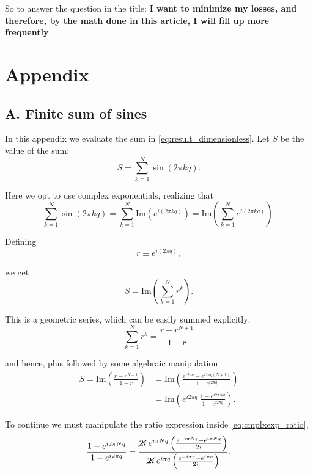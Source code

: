 \documentclass[11pt]{article}
\begin{document}
\par 
So to answer the question in the title: \textbf{I want to minimize my losses, and therefore, by the math done in this article, I will fill up more frequently}.


\section*{Appendix}

\subsection*{A. Finite sum of sines}
\label{subsec:sine_sum}

\renewcommand{\theequation}{A.\arabic{equation}}
\renewcommand{\Im}[1]{\text{Im}\left({#1}\right)}
\renewcommand{\exp}[1]{e^{#1}}
In this appendix we evaluate the sum in \eqref{eq:result_dimensionless}. Let $S$ be the value of the sum:
\begin{equation}
S = \sum_{k=1}^{N} \sin (2 \pi k q).
\end{equation}

Here we opt to use complex exponentials, realizing that
\begin{equation}
\sum_{k=1}^{N} \sin (2 \pi k q) = \sum_{k=1}^{N} \Im{\exp{i(2 \pi k q)}} = \Im{\sum_{k=1}^{N} \exp{i(2 \pi k q)}}.
\end{equation}

Defining
$$
r \equiv e^{i(2 \pi q)},
$$

we get
\begin{equation}
S = \Im{\sum_{k=1}^{N} r^{k}}.
\end{equation}

This is a geometric series, which can be easily summed explicitly:
\begin{equation}
\sum_{k=1}^{N} r^{k} = \frac{r - r^{N+1}}{1 - r}
\end{equation}

and hence, plus followed by some algebraic manipulation
\begin{align}
S = \Im{\frac{r - r^{N+1}}{1 - r}} &= \Im{\frac{\exp{i 2\pi q} - \exp{i 2\pi q (N+1)}}{1 - \exp{i 2\pi q}}} \nonumber \\[0.4em]
 &= \Im{\exp{i 2\pi q} \: \frac{1 - \exp{i 2\pi Nq}}{1 - \exp{i 2\pi q}}}. \label{eq:cmplxexp_ratio}
\end{align}

To continue we must manipulate the ratio expression inside \eqref{eq:cmplxexp_ratio},
$$
\frac{1 - \exp{i 2\pi Nq}}{1 - \exp{i 2 \pi q}} = 
\frac{\cancel{2i} \: \exp{i \pi Nq}\left(\frac{\exp{-i\pi Nq} - \exp{i\pi Nq}}{2i}\right)}{\cancel{2i} \: \exp{i\pi q} \left( \frac{\exp{-i\pi q} - \exp{i\pi q}}{2i}\right)}.
$$
\end{document}
